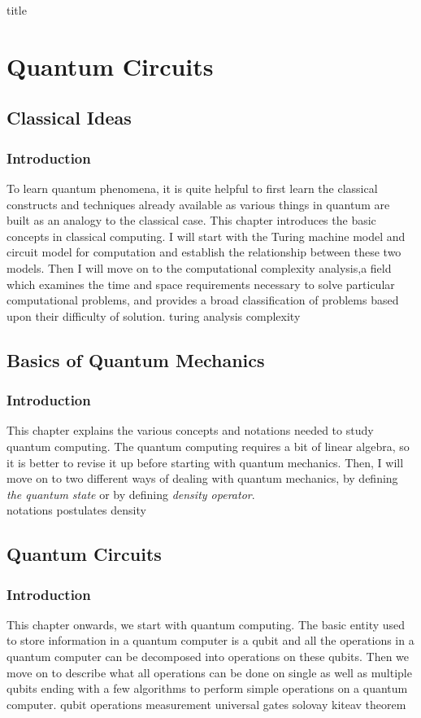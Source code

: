 \documentclass[12pt,a4paper]{report}
\begin{document}
{title}
\tableofcontents
\part{Quantum Circuits}
\chapter{Classical Ideas}
\section{Introduction}
To learn quantum phenomena, it is quite helpful to first learn the classical constructs and techniques already available as various things in quantum are built as an analogy to the classical case. This chapter introduces the basic concepts in classical computing. I will start with the Turing machine model and circuit model for computation and establish the relationship between these two models. Then I will move on to the computational complexity analysis,a field which examines the time and space requirements necessary to solve particular computational problems, and provides a broad classification of problems based upon their difficulty of solution.
\newpage
{turing}
{analysis}
{complexity}

\chapter{Basics of Quantum Mechanics}
\section{Introduction}
This chapter explains the various concepts and notations needed to study quantum computing. The quantum computing requires a bit of linear algebra, so it is better to revise it up before starting with quantum mechanics. Then, I will move on to two different ways of dealing with quantum mechanics, by defining {\it the quantum state} or by defining {\it density operator}.\\
{notations}
{postulates}
{density}

\chapter{Quantum Circuits}
\section{Introduction}
This chapter onwards, we start with quantum computing. The basic entity used to store information in a quantum computer is a qubit and all the operations in a quantum computer can be decomposed into operations on these qubits. Then we move on to describe what all operations can be done on single as well as multiple qubits ending with a few algorithms to perform simple operations on a quantum computer.  
{qubit}
{operations}
{measurement}
{universal gates}
{solovay kiteav theorem}
\end{document}
